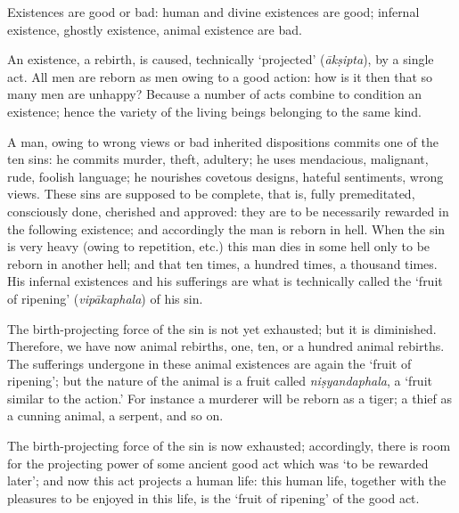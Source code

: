 \documentclass[a4paper, 11pt, oneside, english, landscape]{article}
\begin{document}
Existences are good or bad: human and divine existences are good; infernal existence, ghostly existence, animal existence are bad.

An existence, a rebirth, is caused, technically `projected' (\emph{ākṣipta}), by a single act. All men are reborn as men owing to a good action: how is it then that so many men are unhappy? Because a number of acts combine to condition an existence; hence the variety of the living beings belonging to the same kind.

A man, owing to wrong views or bad inherited dispositions commits one of the ten sins: he commits murder, theft, adultery; he uses mendacious, malignant, rude, foolish language; he nourishes covetous designs, hateful sentiments, wrong views. These sins are supposed to be complete, that is, fully premeditated, consciously done, cherished and approved: they are to be necessarily rewarded in the following existence; and accordingly the man is reborn in hell. When the sin is very heavy (owing to repetition, etc.) this man dies in some hell only to be reborn in another hell; and that ten times, a hundred times, a thousand times. His infernal existences and his sufferings are what is technically called the `fruit of ripening' (\emph{vipākaphala}) of his sin.

The birth-projecting force of the sin is not yet exhausted; but it is diminished. Therefore, we have now animal rebirths, one, ten, or a hundred animal rebirths. The sufferings undergone in these animal existences are again the `fruit of ripening'; but the nature of the animal is a fruit called \emph{niṣyandaphala}, a `fruit similar to the action.' For instance a murderer will be reborn as a tiger; a thief as a cunning animal, a serpent, and so on.

The birth-projecting force of the sin is now exhausted; accordingly, there is room for the projecting power of some ancient good act which was `to be rewarded later'; and now this act projects a human life: this human life, together with the pleasures to be enjoyed in this life, is the `fruit of ripening' of the good act.
\end{document}
